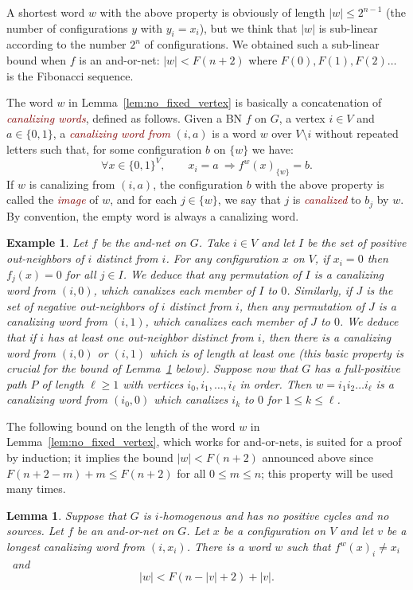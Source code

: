 \documentclass[11pt,letter]{article}
\newtheorem{lemma}{Lemma}
\newtheorem{example}{Example}
\newcommand{\EM}[1]{{\em\textcolor{Maroon}{#1}}}
\newcommand{\B}{\{0,1\}}
\begin{document}
A shortest word $w$ with the above property is obviously of length $|w|\leq 2^{n-1}$ (the number of configurations $y$ with $y_i=x_i$), but we think that $|w|$ is sub-linear according to the number $2^n$ of configurations. We obtained such a sub-linear bound when $f$ is an and-or-net: $|w|< F(n+2)$ where $F(0),F(1),F(2)\dots$ is the Fibonacci sequence. 

\medskip
The word $w$ in Lemma~\ref{lem:no_fixed_vertex} is basically a concatenation of \EM{canalizing words}, defined as follows. Given a BN $f$ on $G$, a vertex $i\in V$ and $a\in\B$, a \EM{canalizing word from} $(i,a)$ is a word $w$ over $V\setminus i$ without repeated letters such that, for some configuration $b$ on $\{w\}$ we have:
\[
\forall x\in\B^V,\qquad x_i=a~\Rightarrow f^w(x)_{\{w\}}=b.
\]   
If $w$ is canalizing from $(i,a)$, the configuration $b$ with the above property is called the \EM{image} of $w$, and for each $j\in\{w\}$, we say that $j$ is \EM{canalized} to $b_j$ by $w$. By convention, the empty word is always a canalizing word.  

\begin{example}
Let $f$ be the and-net on $G$. Take $i\in V$ and let $I$ be the set of positive out-neighbors of $i$ distinct from $i$. For any configuration $x$ on $V$, if $x_i=0$ then $f_j(x)=0$ for all $j\in I$. We deduce that any permutation of $I$ is a canalizing word from $(i,0)$, which canalizes each member of $I$ to $0$. Similarly, if $J$ is the set of negative out-neighbors of $i$ distinct from $i$, then any permutation of $J$ is a canalizing word from $(i,1)$, which canalizes each member of $J$ to $0$. We deduce that if $i$ has at least one out-neighbor distinct from $i$, then there is a canalizing word from $(i,0)$ or $(i,1)$ which is of length at least one (this basic property is crucial for the bound of Lemma~\ref{lem:no_fixed_vertex_2} below). Suppose now that $G$ has a full-positive path $P$ of length $\ell\geq 1$ with vertices $i_0,i_1,\dots,i_\ell$ in order. Then $w=i_1i_2\dots i_\ell$ is a canalizing word from $(i_0,0)$ which canalizes $i_k$ to $0$ for $1\leq k\leq\ell$.
\end{example}

\medskip
The following bound on the length of the word $w$ in Lemma~\ref{lem:no_fixed_vertex}, which works for and-or-nets, is suited for a proof by induction; it implies the bound $|w|< F(n+2)$ announced above since $F(n+2-m)+m\leq F(n+2)$ for all $0\leq m\leq n$; this property will be used many times. 


\begin{lemma}\label{lem:no_fixed_vertex_2}
Suppose that $G$ is $i$-homogenous and has no positive cycles and no sources. Let $f$ be an and-or-net on $G$. Let $x$ be a configuration on $V$ and let $v$ be a longest canalizing word from $(i,x_i)$. There is a word $w$ such that $f^w(x)_i\neq x_i$~and
\[
|w|< F(n-|v|+2)+|v|.
\]
\end{lemma}
\end{document}
